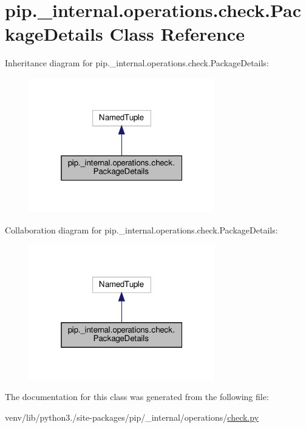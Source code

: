 \hypertarget{classpip_1_1__internal_1_1operations_1_1check_1_1PackageDetails}{}\section{pip.\+\_\+internal.\+operations.\+check.\+Package\+Details Class Reference}
\label{classpip_1_1__internal_1_1operations_1_1check_1_1PackageDetails}


Inheritance diagram for pip.\+\_\+internal.\+operations.\+check.\+Package\+Details\+:
\nopagebreak
\begin{figure}[H]
\begin{center}
\leavevmode
\includegraphics[width=229pt]{classpip_1_1__internal_1_1operations_1_1check_1_1PackageDetails__inherit__graph}
\end{center}
\end{figure}


Collaboration diagram for pip.\+\_\+internal.\+operations.\+check.\+Package\+Details\+:
\nopagebreak
\begin{figure}[H]
\begin{center}
\leavevmode
\includegraphics[width=229pt]{classpip_1_1__internal_1_1operations_1_1check_1_1PackageDetails__coll__graph}
\end{center}
\end{figure}


The documentation for this class was generated from the following file\+:\begin{DoxyCompactItemize}
\item 
venv/lib/python3./site-\/packages/pip/\+\_\+internal/operations/\hyperlink{pip_2__internal_2operations_2check_8py}{check.\+py}\end{DoxyCompactItemize}
